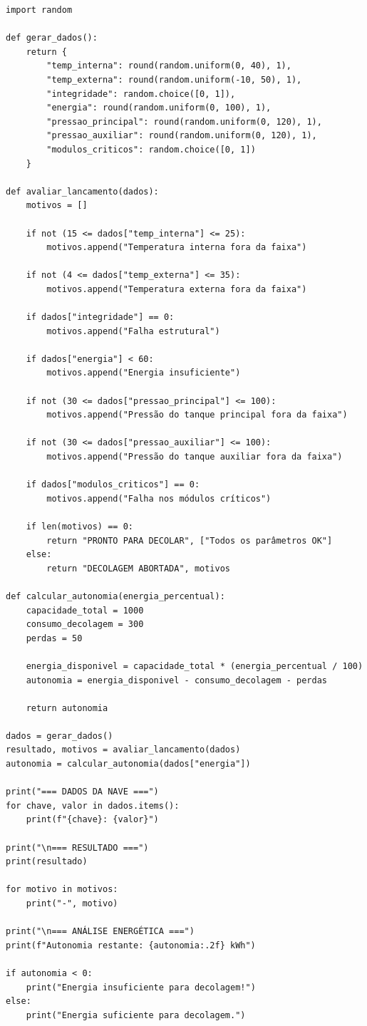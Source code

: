 \documentclass[12pt]{article}
\begin{document}
\begin{lstlisting}[style=pythonstyle]
import random

def gerar_dados():
    return {
        "temp_interna": round(random.uniform(0, 40), 1),
        "temp_externa": round(random.uniform(-10, 50), 1),
        "integridade": random.choice([0, 1]),
        "energia": round(random.uniform(0, 100), 1),
        "pressao_principal": round(random.uniform(0, 120), 1),
        "pressao_auxiliar": round(random.uniform(0, 120), 1),
        "modulos_criticos": random.choice([0, 1])
    }

def avaliar_lancamento(dados):
    motivos = []

    if not (15 <= dados["temp_interna"] <= 25):
        motivos.append("Temperatura interna fora da faixa")

    if not (4 <= dados["temp_externa"] <= 35):
        motivos.append("Temperatura externa fora da faixa")

    if dados["integridade"] == 0:
        motivos.append("Falha estrutural")

    if dados["energia"] < 60:
        motivos.append("Energia insuficiente")

    if not (30 <= dados["pressao_principal"] <= 100):
        motivos.append("Pressão do tanque principal fora da faixa")

    if not (30 <= dados["pressao_auxiliar"] <= 100):
        motivos.append("Pressão do tanque auxiliar fora da faixa")

    if dados["modulos_criticos"] == 0:
        motivos.append("Falha nos módulos críticos")

    if len(motivos) == 0:
        return "PRONTO PARA DECOLAR", ["Todos os parâmetros OK"]
    else:
        return "DECOLAGEM ABORTADA", motivos

def calcular_autonomia(energia_percentual):
    capacidade_total = 1000
    consumo_decolagem = 300
    perdas = 50

    energia_disponivel = capacidade_total * (energia_percentual / 100)
    autonomia = energia_disponivel - consumo_decolagem - perdas

    return autonomia

dados = gerar_dados()
resultado, motivos = avaliar_lancamento(dados)
autonomia = calcular_autonomia(dados["energia"])

print("=== DADOS DA NAVE ===")
for chave, valor in dados.items():
    print(f"{chave}: {valor}")

print("\n=== RESULTADO ===")
print(resultado)

for motivo in motivos:
    print("-", motivo)

print("\n=== ANÁLISE ENERGÉTICA ===")
print(f"Autonomia restante: {autonomia:.2f} kWh")

if autonomia < 0:
    print("Energia insuficiente para decolagem!")
else:
    print("Energia suficiente para decolagem.")
\end{lstlisting}
\end{document}
